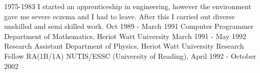 \begin{flushleft}
1975-1983 I started an apprenticeship in engineering, however the environment gave me severe 
eczema and I had to leave. After this I carried out 
diverse unskilled and semi skilled work. \newline
Oct 1989 -  March 1991   Computer Programmer \newline
Department of Mathematics, Heriot Watt University \newline
March 1991  -  May 1992  
Research Assistant \newline
Department of Physics, Heriot Watt University \newline
Research Fellow RA(1B/1A) \newline
NUTIS/ESSC (University of Reading),    April 1992 - October 2002 \newline


\end{flushleft}



